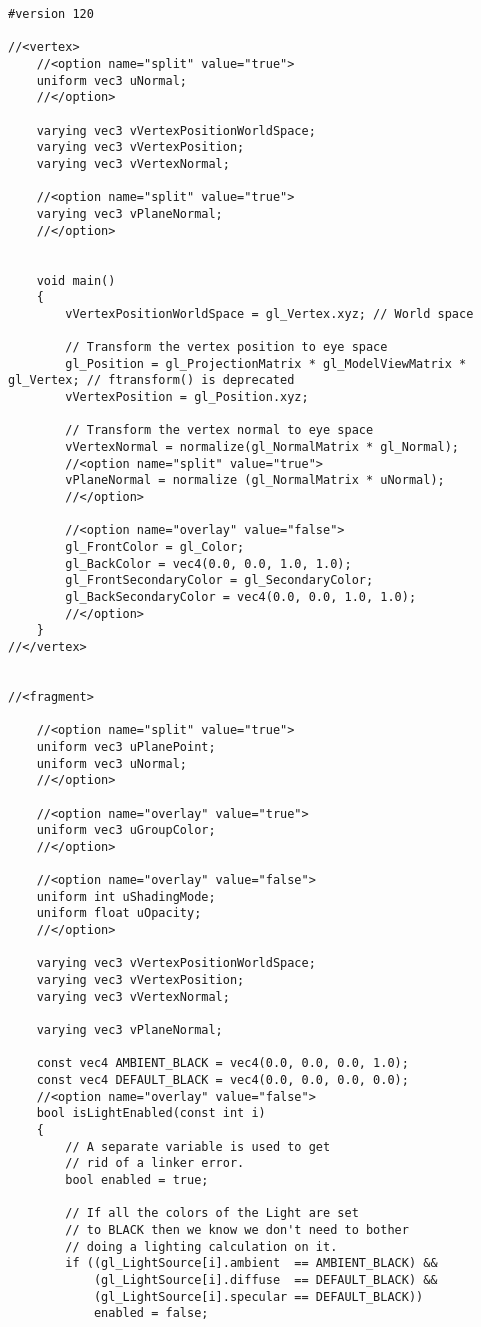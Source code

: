 
\begin{verbatim}
#version 120

//<vertex>
	//<option name="split" value="true">
	uniform vec3 uNormal;
	//</option>		
	
	varying vec3 vVertexPositionWorldSpace;
	varying vec3 vVertexPosition;	
	varying vec3 vVertexNormal;	
	
	//<option name="split" value="true">
	varying vec3 vPlaneNormal;
	//</option>		

	
	void main()
	{		
	    vVertexPositionWorldSpace = gl_Vertex.xyz; // World space
	    
		// Transform the vertex position to eye space
		gl_Position = gl_ProjectionMatrix * gl_ModelViewMatrix * gl_Vertex; // ftransform() is deprecated
		vVertexPosition = gl_Position.xyz;
	       
		// Transform the vertex normal to eye space
		vVertexNormal = normalize(gl_NormalMatrix * gl_Normal);
		//<option name="split" value="true">
		vPlaneNormal = normalize (gl_NormalMatrix * uNormal);
		//</option>		

		//<option name="overlay" value="false">
		gl_FrontColor = gl_Color;
		gl_BackColor = vec4(0.0, 0.0, 1.0, 1.0);
		gl_FrontSecondaryColor = gl_SecondaryColor;
		gl_BackSecondaryColor = vec4(0.0, 0.0, 1.0, 1.0);
		//</option>	
	}
//</vertex>


//<fragment>

	//<option name="split" value="true">
	uniform vec3 uPlanePoint;
	uniform vec3 uNormal;
	//</option>		
	
	//<option name="overlay" value="true">	
	uniform vec3 uGroupColor;
	//</option>
	
	//<option name="overlay" value="false">
	uniform int uShadingMode;
	uniform float uOpacity;
	//</option>	
		
	varying vec3 vVertexPositionWorldSpace;
	varying vec3 vVertexPosition;	
	varying vec3 vVertexNormal;	

	varying vec3 vPlaneNormal;
	
	const vec4 AMBIENT_BLACK = vec4(0.0, 0.0, 0.0, 1.0);
	const vec4 DEFAULT_BLACK = vec4(0.0, 0.0, 0.0, 0.0);
	//<option name="overlay" value="false">
	bool isLightEnabled(const int i)
	{
		// A separate variable is used to get
		// rid of a linker error.
		bool enabled = true;
	   
		// If all the colors of the Light are set
		// to BLACK then we know we don't need to bother
		// doing a lighting calculation on it.
		if ((gl_LightSource[i].ambient  == AMBIENT_BLACK) &&
			(gl_LightSource[i].diffuse  == DEFAULT_BLACK) &&
			(gl_LightSource[i].specular == DEFAULT_BLACK))
			enabled = false;
	       

\end{verbatim}
